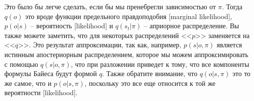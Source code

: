 \documentclass[twoside,leqno, 11pt]{article}
\begin{document}
	
	\begin{figure}[h]
	\end{figure}
	
	Это было бы легче сделать, если бы мы пренебрегли зависимостью от $\pi$. Тогда $q(o)$ это вроде функции предельного правдоподобия [marginal likelihood], $p(o|s)$ -- вероятность [likelihood] и $q(s_t|\pi)$ -- априорное распределение. Вы также можете заметить, что для некоторых распределений <<$p$>> заменяется на <<$q$>>. Это результат аппроксимации, так как, например, $p(s|o,\pi)$ является истинным апостериорным распределением, которое мы можем аппроксимировать с помощью $q(s|o,\pi)$, что при разложении приведет к тому, что все компоненты формулы Байеса будут формой $q$. Также обратите внимание, что $q(o|s,\pi)$ это то же самое, что и $p(o|s,\pi)$, поскольку это все еще относится к той же вероятности [likelihood].
	
	
\end{document}
